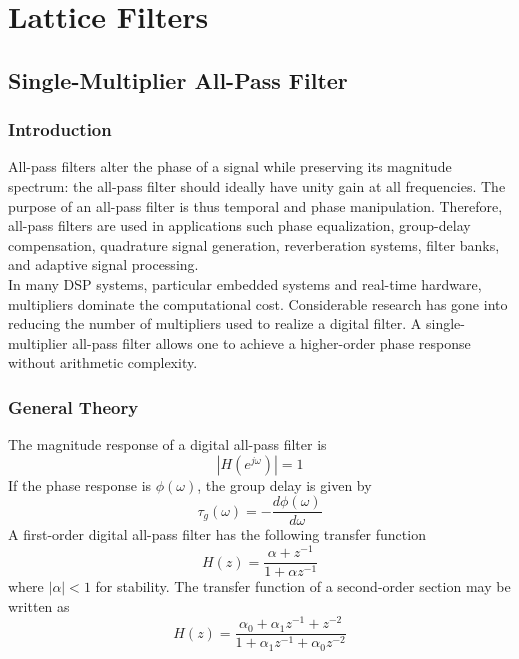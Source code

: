 \documentclass[11pt]{report}
\theoremstyle{example}
\begin{document}
\chapter{Lattice Filters}

\section{Single-Multiplier All-Pass Filter}

\subsection{Introduction}

All-pass filters alter the phase of a signal while preserving its magnitude spectrum: the all-pass filter should ideally have unity gain at all frequencies. The purpose of an all-pass filter is thus temporal and phase manipulation. Therefore, all-pass filters are used in applications such phase equalization, group-delay compensation, quadrature signal generation, reverberation systems, filter banks, and adaptive signal processing.\\
In many DSP systems, particular embedded systems and real-time hardware, multipliers dominate the computational cost. Considerable research has gone into reducing the number of multipliers used to realize a digital filter. A single-multiplier all-pass filter allows one to achieve a higher-order phase response without arithmetic complexity.

\subsection{General Theory}

The magnitude response of a digital all-pass filter is
\begin{equation}
	|H(e^{j\omega})|=1
\end{equation}
If the phase response is $\phi(\omega)$, the group delay is given by
\begin{equation}
	\tau_g(\omega)=-\frac{d\phi(\omega)}{d\omega}
\end{equation}
A first-order digital all-pass filter has the following transfer function
\begin{equation}
	H(z)=\frac{\alpha+z^{-1}}{1+\alpha z^{-1}}
\end{equation}
where $|\alpha|<1$ for stability.
The transfer function of a second-order section may be written as
\begin{equation}
	H(z)=\frac{\alpha_0+\alpha_1z^{-1}+z^{-2}}{1+\alpha_1z^{-1}+\alpha_0z^{-2}}
\end{equation}
\end{document}
